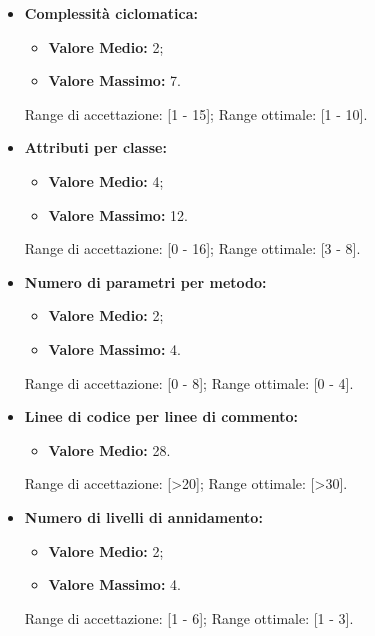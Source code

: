 \begin{itemize}
	
	\item \textbf{Complessità ciclomatica:}
	\begin{itemize}
		\item \textbf{Valore Medio:} 2;
		\item \textbf{Valore Massimo:} 7.
	\end{itemize}
	
	Range di accettazione: [1 - 15];\newline
	Range ottimale: [1 - 10].
	
	
	\item \textbf{Attributi per classe:}
	\begin{itemize}
		\item \textbf{Valore Medio:} 4;
		\item \textbf{Valore Massimo:} 12.
	\end{itemize}
	
	Range di accettazione: [0 - 16];\newline
	Range ottimale: [3 - 8].
	
	
	\item \textbf{Numero di parametri per metodo:}
	\begin{itemize}
		\item \textbf{Valore Medio:} 2;
		\item \textbf{Valore Massimo:} 4.
	\end{itemize}
	
	Range di accettazione: [0 - 8];\newline
	Range ottimale: [0 - 4].
	
	
	\item \textbf{Linee di codice per linee di commento:}
	\begin{itemize}
		\item \textbf{Valore Medio:} 28.
	\end{itemize}
	
	Range di accettazione: [>20];\newline
	Range ottimale: [>30].
	
	
	\item \textbf{Numero di livelli di annidamento:}
	\begin{itemize}
		\item \textbf{Valore Medio:} 2;
		\item \textbf{Valore Massimo:} 4.
	\end{itemize}
	
	Range di accettazione: [1 - 6];\newline
	Range ottimale: [1 - 3].
	

\end{itemize}
